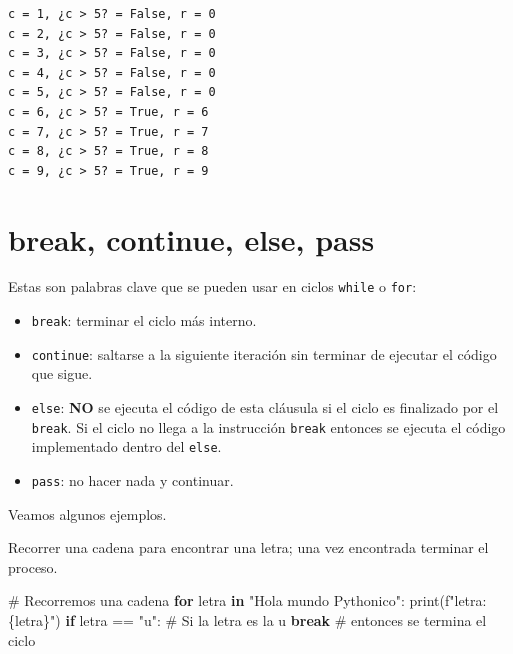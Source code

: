 \documentclass[
  spanish,
  letterpaper,
]{scrbook}
\newenvironment{Shaded}{\begin{snugshade}}{\end{snugshade}}
\newcommand{\BuiltInTok}[1]{\textcolor[rgb]{0.00,0.23,0.31}{#1}}
\newcommand{\CommentTok}[1]{\textcolor[rgb]{0.37,0.37,0.37}{#1}}
\newcommand{\ControlFlowTok}[1]{\textcolor[rgb]{0.00,0.23,0.31}{\textbf{#1}}}
\newcommand{\KeywordTok}[1]{\textcolor[rgb]{0.00,0.23,0.31}{\textbf{#1}}}
\newcommand{\NormalTok}[1]{\textcolor[rgb]{0.00,0.23,0.31}{#1}}
\newcommand{\OperatorTok}[1]{\textcolor[rgb]{0.37,0.37,0.37}{#1}}
\newcommand{\SpecialCharTok}[1]{\textcolor[rgb]{0.37,0.37,0.37}{#1}}
\newcommand{\SpecialStringTok}[1]{\textcolor[rgb]{0.13,0.47,0.30}{#1}}
\newcommand{\StringTok}[1]{\textcolor[rgb]{0.13,0.47,0.30}{#1}}
\providecommand{\tightlist}{%
  \setlength{\itemsep}{0pt}\setlength{\parskip}{0pt}}
\theoremstyle{definition}
\theoremstyle{remark}
\newcounter{quartocalloutexmno}
\newcommand{\quartocalloutexm}[1]{\refstepcounter{quartocalloutexmno}\label{#1}}
\begin{document}
\begin{verbatim}
c = 1, ¿c > 5? = False, r = 0
c = 2, ¿c > 5? = False, r = 0
c = 3, ¿c > 5? = False, r = 0
c = 4, ¿c > 5? = False, r = 0
c = 5, ¿c > 5? = False, r = 0
c = 6, ¿c > 5? = True, r = 6
c = 7, ¿c > 5? = True, r = 7
c = 8, ¿c > 5? = True, r = 8
c = 9, ¿c > 5? = True, r = 9
\end{verbatim}

\section{break, continue, else, pass}\label{break-continue-else-pass}

Estas son palabras clave que se pueden usar en ciclos \texttt{while} o
\texttt{for}:

\begin{itemize}
\tightlist
\item
  \texttt{break}: terminar el ciclo más interno.
\item
  \texttt{continue}: saltarse a la siguiente iteración sin terminar de
  ejecutar el código que sigue.
\item
  \texttt{else}: \textbf{NO} se ejecuta el código de esta cláusula si el
  ciclo es finalizado por el \texttt{break}. Si el ciclo no llega a la
  instrucción \texttt{break} entonces se ejecuta el código implementado
  dentro del \texttt{else}.
\item
  \texttt{pass}: no hacer nada y continuar.
\end{itemize}

Veamos algunos ejemplos.

\begin{tcolorbox}[enhanced jigsaw, colframe=quarto-callout-tip-color-frame, opacityback=0, toprule=.15mm, colback=white, coltitle=black, leftrule=.75mm, arc=.35mm, breakable, left=2mm, bottomtitle=1mm, rightrule=.15mm, bottomrule=.15mm, colbacktitle=quarto-callout-tip-color!10!white, toptitle=1mm, titlerule=0mm, opacitybacktitle=0.6, title={Tip \ref*{exm-h-8}: \texttt{break}.}]

\quartocalloutexm{exm-h-8} 

Recorrer una cadena para encontrar una letra; una vez encontrada
terminar el proceso.

\end{tcolorbox}

\begin{Shaded}
\begin{Highlighting}[]
\CommentTok{\# Recorremos una cadena}
\ControlFlowTok{for}\NormalTok{ letra }\KeywordTok{in} \StringTok{"Hola mundo Pythonico"}\NormalTok{:}
    \BuiltInTok{print}\NormalTok{(}\SpecialStringTok{f"letra: }\SpecialCharTok{\{}\NormalTok{letra}\SpecialCharTok{\}}\SpecialStringTok{"}\NormalTok{)}
    \ControlFlowTok{if}\NormalTok{ letra }\OperatorTok{==} \StringTok{"u"}\NormalTok{:   }\CommentTok{\# Si la letra es la \textquotesingle{}u\textquotesingle{}}
        \ControlFlowTok{break}          \CommentTok{\# entonces se termina el ciclo}
\end{Highlighting}
\end{Shaded}
\end{document}
